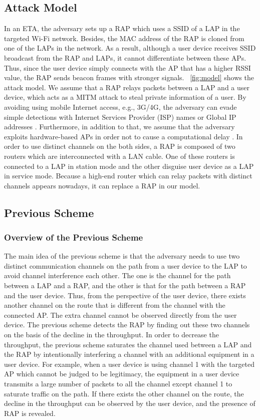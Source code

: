 \documentclass[conference]{IEEEtran}
\begin{document}
\subsection{Attack Model}
In an ETA, the adversary sets up a RAP which uses a SSID of a LAP in the targeted Wi-Fi network.
Besides, the MAC address of the RAP is cloned from one of the LAPs in the network\cite{spoof-evi}.
As a result, although a user device receives SSID broadcast from the RAP and LAPs, it cannot differentiate between these APs.
Thus, since the user device simply connects with the AP that has a higher RSSI value, the RAP sends beacon frames with stronger signals.
\figurename~\ref{fig:model} shows the attack model.
We assume that a RAP relays packets between a LAP and a user device, which acts as a MITM attack to steal private information of a user.
By avoiding using mobile Internet access, e.g., 3G/4G, the adversary can evade simple detections with Internet Services Provider (ISP) names or Global IP addresses \cite{rtt}.
Furthermore, in addition to that, we assume that the adversary exploits hardware-based APs in order not to cause a computational delay \cite{previous}.
In order to use distinct channels on the both sides, a RAP is composed of two routers which are interconnected with a LAN cable.
One of these routers is connected to a LAP in station mode and the other disguise user device as a LAP in service mode.
Because a high-end router which can relay packets with distinct channels appears nowadays, it can replace a RAP in our model.

\subsection{Previous Scheme}
\subsubsection{Overview of the Previous Scheme}
The main idea of the previous scheme \cite{previous} is that the adversary needs to use two distinct communication channels on the path from a user device to the LAP to avoid channel interference each other.
The one is the channel for the path between a LAP and a RAP, and the other is that for the path between a RAP and the user device.
Thus, from the perspective of the user device, there exists another channel on the route that is different from the channel with the connected AP.
The extra channel cannot be observed directly from the user device.
The previous scheme detects the RAP by finding out these two channels on the basis of the decline in the throughput.
In order to decrease the throughput, the previous scheme saturates the channel used between a LAP and the RAP by intentionally interfering a channel with an additional equipment in a user device.
For example, when a user device is using channel 1 with the targeted AP which cannot be judged to be legitimacy, the equipment in a user device transmits a large number of packets to all the channel except channel 1 to saturate traffic on the path.
If there exists the other channel on the route, the decline in the throughput can be observed by the user device, and the presence of RAP is revealed.
\end{document}
